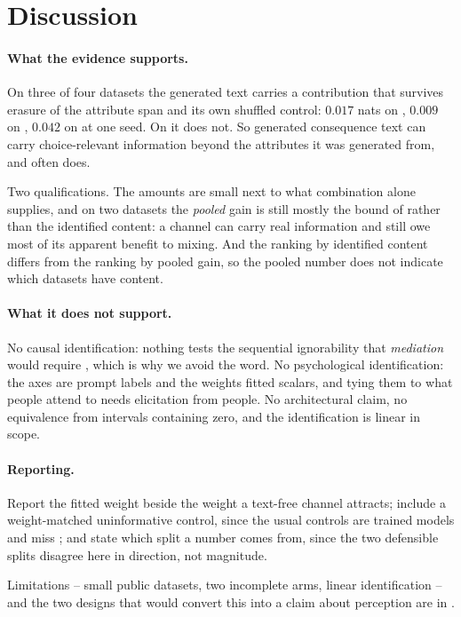 \section{Discussion}
\label{sec:discussion}

\paragraph{What the evidence supports.} On three of four datasets the generated text carries a
contribution that survives erasure of the attribute span and its own shuffled control:
$0.017$ nats on , $0.009$ on , $0.042$ on 
at one seed. On  it does not. So generated consequence text can carry
choice-relevant information beyond the attributes it was generated from, and often does.

Two qualifications. The amounts are small next to what combination alone supplies, and on two
datasets the \emph{pooled} gain is still mostly the bound of  rather than the
identified content: a channel can carry real information and still owe most of its apparent
benefit to mixing. And the ranking by identified content differs from the ranking by pooled
gain, so the pooled number does not indicate which datasets have content.

\paragraph{What it does not support.} No causal identification: nothing tests the sequential
ignorability that \emph{mediation} would require \citep{imai2010general}, which is why we avoid
the word. No psychological identification: the axes are prompt labels and the weights fitted
scalars, and tying them to what people attend to needs elicitation from people. No
architectural claim, no equivalence from intervals containing zero, and the identification is
linear in scope.

\paragraph{Reporting.} Report the fitted weight beside the weight a text-free channel
attracts; include a weight-matched uninformative control, since the usual controls are trained
models and miss ; and state which split a number comes from, since the two
defensible splits disagree here in direction, not magnitude.

Limitations -- small public datasets, two incomplete arms, linear identification -- and the two
designs that would convert this into a claim about perception are in .
